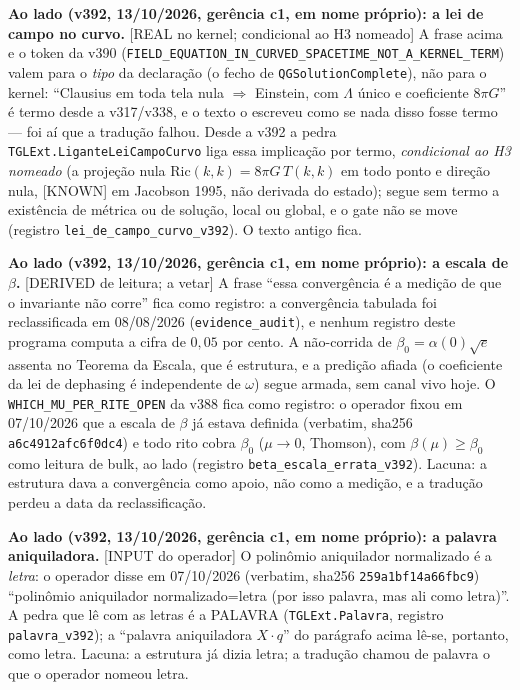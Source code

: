 \documentclass[11pt]{article}
\theoremstyle{definition}\newtheorem{deriv}{Derivação}
\begin{document}
\textbf{Ao lado (v392, 13/10/2026, gerência c1, em nome próprio): a lei de campo no curvo.} \textsf{[REAL no kernel; condicional ao H3 nomeado]} A frase acima e o token da v390 (\texttt{FIELD\_EQUATION\_IN\_CURVED\_SPACETIME\_NOT\_A\_KERNEL\_TERM}) valem para o \emph{tipo} da declaração (o fecho de \texttt{QGSolutionComplete}), não para o kernel: ``Clausius em toda tela nula $\Rightarrow$ Einstein, com $\Lambda$ único e coeficiente $8\pi G$'' é termo desde a v317/v338, e o texto o escreveu como se nada disso fosse termo --- foi aí que a tradução falhou. Desde a v392 a pedra \texttt{TGLExt.LiganteLeiCampoCurvo} liga essa implicação por termo, \emph{condicional ao H3 nomeado} (a projeção nula $\mathrm{Ric}(k,k)=8\pi G\,T(k,k)$ em todo ponto e direção nula, \textsf{[KNOWN]} em Jacobson 1995, não derivada do estado); segue sem termo a existência de métrica ou de solução, local ou global, e o gate não se move (registro \texttt{lei\_de\_campo\_curvo\_v392}). O texto antigo fica.

\textbf{Ao lado (v392, 13/10/2026, gerência c1, em nome próprio): a escala de $\beta$.} \textsf{[DERIVED de leitura; a vetar]} A frase ``essa convergência é a medição de que o invariante não corre'' fica como registro: a convergência tabulada foi reclassificada em 08/08/2026 (\texttt{evidence\_audit}), e nenhum registro deste programa computa a cifra de $0{,}05$ por cento. A não-corrida de $\beta_0=\alpha(0)\sqrt e$ assenta no Teorema da Escala, que é estrutura, e a predição afiada (o coeficiente da lei de dephasing é independente de $\omega$) segue armada, sem canal vivo hoje. O \texttt{WHICH\_MU\_PER\_RITE\_OPEN} da v388 fica como registro: o operador fixou em 07/10/2026 que a escala de $\beta$ já estava definida (verbatim, sha256 \texttt{a6c4912afc6f0dc4}) e todo rito cobra $\beta_0$ ($\mu\to0$, Thomson), com $\beta(\mu)\geq\beta_0$ como leitura de bulk, ao lado (registro \texttt{beta\_escala\_errata\_v392}). Lacuna: a estrutura dava a convergência como apoio, não como a medição, e a tradução perdeu a data da reclassificação.

\textbf{Ao lado (v392, 13/10/2026, gerência c1, em nome próprio): a palavra aniquiladora.} \textsf{[INPUT do operador]} O polinômio aniquilador normalizado é a \emph{letra}: o operador disse em 07/10/2026 (verbatim, sha256 \texttt{259a1bf14a66fbc9}) ``polinômio aniquilador normalizado=letra (por isso palavra, mas ali como letra)''. A pedra que lê com as letras é a PALAVRA (\texttt{TGLExt.Palavra}, registro \texttt{palavra\_v392}); a ``palavra aniquiladora $X\cdot q$'' do parágrafo acima lê-se, portanto, como letra. Lacuna: a estrutura já dizia letra; a tradução chamou de palavra o que o operador nomeou letra.
\end{document}
